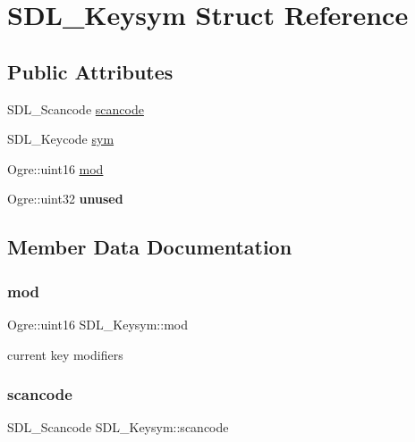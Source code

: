 \hypertarget{struct_s_d_l___keysym}{}\section{S\+D\+L\+\_\+\+Keysym Struct Reference}
\label{struct_s_d_l___keysym}
\subsection*{Public Attributes}
\begin{DoxyCompactItemize}
\item 
S\+D\+L\+\_\+\+Scancode \hyperlink{struct_s_d_l___keysym_ad47e9120a511e2efc7ec0c6d8a5ec51e}{scancode}
\item 
S\+D\+L\+\_\+\+Keycode \hyperlink{struct_s_d_l___keysym_a082ff1fd787b79fa6c3a445deb225f08}{sym}
\item 
Ogre\+::uint16 \hyperlink{struct_s_d_l___keysym_a4cbea3e7dd2e50cc57fe05c3af3921fc}{mod}
\item 
\mbox{\label{struct_s_d_l___keysym_a423ef40f9956ee0fe3dc9690189461a3}} 
Ogre\+::uint32 {\bfseries unused}
\end{DoxyCompactItemize}


\subsection{Member Data Documentation}
\mbox{\label{struct_s_d_l___keysym_a4cbea3e7dd2e50cc57fe05c3af3921fc}} 
\subsubsection{\texorpdfstring{mod}{mod}}
{\footnotesize\ttfamily Ogre\+::uint16 S\+D\+L\+\_\+\+Keysym\+::mod}

current key modifiers \mbox{\label{struct_s_d_l___keysym_ad47e9120a511e2efc7ec0c6d8a5ec51e}} 
\subsubsection{\texorpdfstring{scancode}{scancode}}
{\footnotesize\ttfamily S\+D\+L\+\_\+\+Scancode S\+D\+L\+\_\+\+Keysym\+::scancode}

